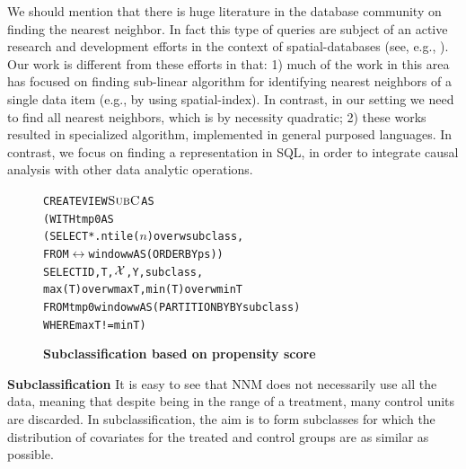 {We should mention that there is huge literature in the database
community on finding the nearest neighbor. In fact this type of
queries are subject of an active research and development efforts in
the context of spatial-databases (see, e.g.,
\cite{obe2015postgis}). Our work is different from these efforts in that: 1) much of the work in this area has focused on finding sub-linear algorithm for identifying nearest neighbors of a single data item (e.g., by using spatial-index). In contrast, in our setting
we need to find all nearest neighbors, which is by necessity quadratic; 2) these works resulted in specialized algorithm,
implemented in general purposed languages. In contrast, we focus on finding a representation in SQL, in order to integrate causal
 analysis with other data analytic operations.  

}









\begin{figure}
\begin{alltt} \scriptsize
CREATE VIEW \(\sbc\) AS
(WITH tmp0 AS
  (SELECT *. ntile(\(n\)) over w subclass,
   FROM \(\rel\) window w AS (ORDER BY ps))
SELECT ID, T, \(\ccv\), Y, subclass,
             max(T) over w maxT, min(T) over w minT
FROM tmp0  window w AS (PARTITION BY BY subclass)
WHERE maxT!=minT)
\end{alltt}
\vspace{-0.3cm}
  \caption{\bf{Subclassification based on  propensity score}}\label{fig:subpr}
\end{figure}


{\bf Subclassification}
\label{sec:sub}
It is easy to see that NNM does not necessarily use all the data,
meaning that despite being in the range of a
treatment, many control units are discarded.  In subclassification, the aim is to
form subclasses for which the distribution of covariates for the
treated and control groups are as similar as possible.  


